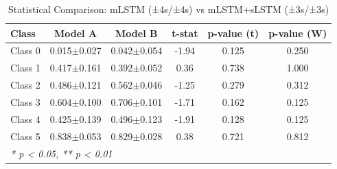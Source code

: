 \begin{table}[htbp]
\centering
\caption{Statistical Comparison: mLSTM (±4s/±4s) vs mLSTM+sLSTM (±3s/±3s)}
\label{tab:comparison_class_mlstm_±4s_±4s_vs_mlstmslstm_±3s_±3s}
\begin{tabular}{lccccc}
\toprule
\textbf{Class} & \textbf{Model A} & \textbf{Model B} & \textbf{t-stat} & \textbf{p-value (t)} & \textbf{p-value (W)} \\
\midrule
Class 0 & 0.015$\pm$0.027 & 0.042$\pm$0.054 & -1.94 & 0.125 & 0.250 \\
Class 1 & 0.417$\pm$0.161 & 0.392$\pm$0.052 & 0.36 & 0.738 & 1.000 \\
Class 2 & 0.486$\pm$0.121 & 0.562$\pm$0.046 & -1.25 & 0.279 & 0.312 \\
Class 3 & 0.604$\pm$0.100 & 0.706$\pm$0.101 & -1.71 & 0.162 & 0.125 \\
Class 4 & 0.425$\pm$0.139 & 0.496$\pm$0.123 & -1.91 & 0.128 & 0.125 \\
Class 5 & 0.838$\pm$0.053 & 0.829$\pm$0.028 & 0.38 & 0.721 & 0.812 \\
\bottomrule
\multicolumn{6}{l}{\textit{* p < 0.05, ** p < 0.01}} \\
\end{tabular}
\end{table}